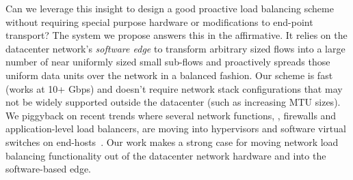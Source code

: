 Can we leverage this insight to design a good proactive load balancing scheme without requiring special purpose hardware or modifications to end-point transport? The system we propose answers this in the affirmative. It relies on the datacenter network's {\em software edge} to transform arbitrary sized flows into a large number of near uniformly sized small sub-flows and proactively spreads those uniform data units over the network in a balanced fashion. Our scheme is fast (works at 10+ Gbps) and doesn't require network stack configurations that may not be widely supported outside the datacenter (such as increasing MTU sizes). We piggyback on recent trends where several network functions, \eg{}, firewalls and application-level load balancers, are moving into hypervisors and software virtual switches on end-hosts~\cite{nv-mtd,ovs-extending,eden}. Our work makes a strong case for moving network load balancing functionality out of the datacenter network hardware and into the software-based edge.


\iffalse
Fortunately, many commonly deployed network topologies like 2-tier folded Clos (leaf-spine) already meet the network symmetry 
requirements though asymmetry may occur due to failures and should be handled. The main challenge then is to achieve uniformity 
in flow sizes i.e. a mechanism that can efficiently multiplex and de-multiplex logical flows into a more uniformly sized smaller 
sub-flow units. This mapping and the load balancing of the resulting units should ideally be done 
in the network itself instead of transport layer.
\fi


